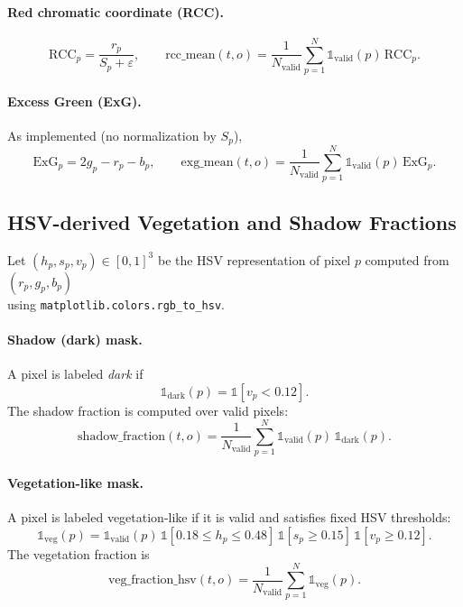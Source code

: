 \documentclass{article}
\begin{document}
\paragraph{Red chromatic coordinate (RCC).}
\begin{equation}
\mathrm{RCC}_p = \frac{r_p}{S_p+\varepsilon},
\qquad
\mathrm{rcc\_mean}(t,o) = \frac{1}{N_{\mathrm{valid}}}\sum_{p=1}^{N} \mathbb{1}_{\mathrm{valid}}(p)\,\mathrm{RCC}_p.
\end{equation}

\paragraph{Excess Green (ExG).}
As implemented (no normalization by $S_p$),
\begin{equation}
\mathrm{ExG}_p = 2g_p - r_p - b_p,
\qquad
\mathrm{exg\_mean}(t,o)=\frac{1}{N_{\mathrm{valid}}}\sum_{p=1}^{N}\mathbb{1}_{\mathrm{valid}}(p)\,\mathrm{ExG}_p.
\end{equation}

\subsection{HSV-derived Vegetation and Shadow Fractions}

Let $(h_p,s_p,v_p)\in[0,1]^3$ be the HSV representation of pixel $p$ computed from $(r_p,g_p,b_p)$ \\
using \texttt{matplotlib.colors.rgb\_to\_hsv}.

\paragraph{Shadow (dark) mask.}
A pixel is labeled \emph{dark} if
\begin{equation}
\mathbb{1}_{\mathrm{dark}}(p) = \mathbb{1}[v_p < 0.12].
\end{equation}
The shadow fraction is computed over valid pixels:
\begin{equation}
\mathrm{shadow\_fraction}(t,o)=\frac{1}{N_{\mathrm{valid}}}\sum_{p=1}^{N} \mathbb{1}_{\mathrm{valid}}(p)\,\mathbb{1}_{\mathrm{dark}}(p).
\end{equation}

\paragraph{Vegetation-like mask.}
A pixel is labeled vegetation-like if it is valid and satisfies fixed HSV thresholds:
\begin{equation}
\mathbb{1}_{\mathrm{veg}}(p)=\mathbb{1}_{\mathrm{valid}}(p)\,\mathbb{1}[0.18\le h_p\le 0.48]\,\mathbb{1}[s_p\ge 0.15]\,\mathbb{1}[v_p\ge 0.12].
\end{equation}
The vegetation fraction is
\begin{equation}
\mathrm{veg\_fraction\_hsv}(t,o)=\frac{1}{N_{\mathrm{valid}}}\sum_{p=1}^{N}\mathbb{1}_{\mathrm{veg}}(p).
\end{equation}
\end{document}
